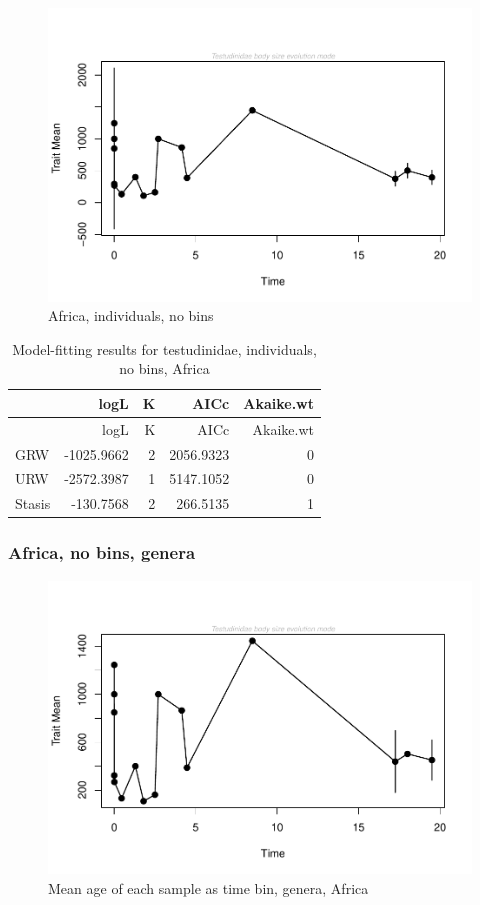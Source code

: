 \documentclass[]{article}
\begin{document}
\begin{figure}[htbp]
\centering
\includegraphics{MA_JJ_files/figure-latex/paleoTS, no bins individuals, Africa-1.pdf}
\caption{Africa, individuals, no bins}
\end{figure}

\begin{longtable}[]{@{}lrrrr@{}}
\caption{Model-fitting results for testudinidae, individuals, no bins,
Africa}\tabularnewline
\toprule
& logL & K & AICc & Akaike.wt\tabularnewline
\midrule
\endfirsthead
\toprule
& logL & K & AICc & Akaike.wt\tabularnewline
\midrule
\endhead
GRW & -1025.9662 & 2 & 2056.9323 & 0\tabularnewline
URW & -2572.3987 & 1 & 5147.1052 & 0\tabularnewline
Stasis & -130.7568 & 2 & 266.5135 & 1\tabularnewline
\bottomrule
\end{longtable}

\newpage 

\subsubsection{Africa, no bins, genera}\label{africa-no-bins-genera}

\begin{figure}[htbp]
\centering
\includegraphics{MA_JJ_files/figure-latex/paleoTS with different time bins, no bins, genera, Africa-1.pdf}
\caption{Mean age of each sample as time bin, genera, Africa}
\end{figure}
\end{document}
